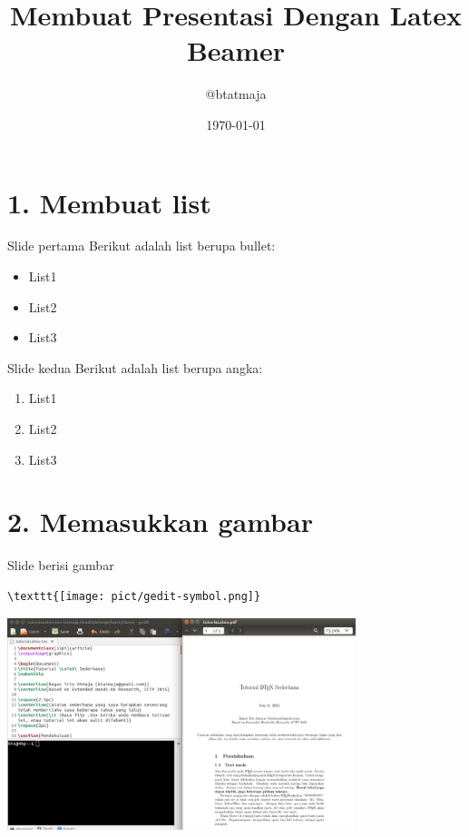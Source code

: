 \documentclass{beamer}
\title{Membuat Presentasi Dengan Latex Beamer}
\author{@btatmaja}
\date{\today}
\begin{document}
	\frame{\titlepage}
	
\section {1. Membuat list}
\begin{frame}[t, fragile]{Slide pertama}
Berikut adalah list berupa bullet:
\begin{itemize}
\item List1
\item List2
\item List3
\end{itemize}
\end{frame}


\begin{frame}[t, fragile]{Slide kedua}
Berikut adalah list berupa angka:
\begin{enumerate}
\item List1
\item List2
\item List3
\end{enumerate}
\end{frame}

\section{2. Memasukkan gambar}
\begin{frame}[t, fragile]{Slide berisi gambar}
\begin{verbatim}
\texttt{[image: pict/gedit-symbol.png]}
\end{verbatim}
\includegraphics[width=4in]{pict/gedit-latex.png}
\end{frame}
\end{document}
